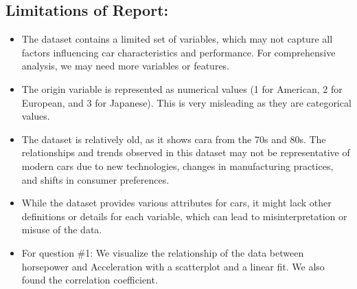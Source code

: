 \documentclass[
]{article}
\newenvironment{Shaded}{\begin{snugshade}}{\end{snugshade}}
\newcommand{\AttributeTok}[1]{\textcolor[rgb]{0.13,0.29,0.53}{#1}}
\newcommand{\ConstantTok}[1]{\textcolor[rgb]{0.56,0.35,0.01}{#1}}
\newcommand{\FunctionTok}[1]{\textcolor[rgb]{0.13,0.29,0.53}{\textbf{#1}}}
\newcommand{\NormalTok}[1]{#1}
\newcommand{\OtherTok}[1]{\textcolor[rgb]{0.56,0.35,0.01}{#1}}
\newcommand{\SpecialCharTok}[1]{\textcolor[rgb]{0.81,0.36,0.00}{\textbf{#1}}}
\newcommand{\StringTok}[1]{\textcolor[rgb]{0.31,0.60,0.02}{#1}}
\providecommand{\tightlist}{%
  \setlength{\itemsep}{0pt}\setlength{\parskip}{0pt}}
\begin{document}
\newpage

\hypertarget{limitations-of-report}{%
\subsection{Limitations of Report:}\label{limitations-of-report}}

\begin{itemize}
\item
  The dataset contains a limited set of variables, which may not capture
  all factors influencing car characteristics and performance. For
  comprehensive analysis, we may need more variables or features.
\item
  The origin variable is represented as numerical values (1 for
  American, 2 for European, and 3 for Japanese). This is very misleading
  as they are categorical values.
\item
  The dataset is relatively old, as it shows cara from the 70s and 80s.
  The relationships and trends observed in this dataset may not be
  representative of modern cars due to new technologies, changes in
  manufacturing practices, and shifts in consumer preferences.
\item
  While the dataset provides various attributes for cars, it might lack
  other definitions or details for each variable, which can lead to
  misinterpretation or misuse of the data.
\end{itemize}

\newpage

\begin{itemize}
\tightlist
\item
  For question \#1: We visualize the relationship of the data between
  horsepower and Acceleration with a scatterplot and a linear fit. We
  also found the correlation coefficient.
\end{itemize}

\begin{Shaded}
\end{Shaded}
\end{document}

